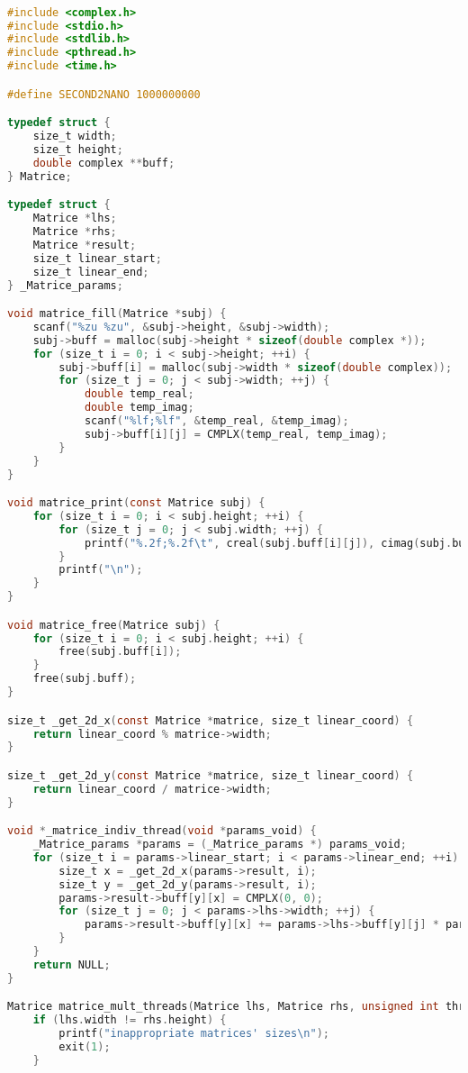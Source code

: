 \begin{lstlisting}[language=C]

#include <complex.h>
#include <stdio.h>
#include <stdlib.h>
#include <pthread.h>
#include <time.h>

#define SECOND2NANO 1000000000

typedef struct {
    size_t width;
    size_t height;
    double complex **buff;
} Matrice;

typedef struct {
    Matrice *lhs;
    Matrice *rhs;
    Matrice *result;
    size_t linear_start;
    size_t linear_end;
} _Matrice_params;

void matrice_fill(Matrice *subj) {
    scanf("%zu %zu", &subj->height, &subj->width);
    subj->buff = malloc(subj->height * sizeof(double complex *));
    for (size_t i = 0; i < subj->height; ++i) {
        subj->buff[i] = malloc(subj->width * sizeof(double complex));
        for (size_t j = 0; j < subj->width; ++j) {
            double temp_real;
            double temp_imag;
            scanf("%lf;%lf", &temp_real, &temp_imag);
            subj->buff[i][j] = CMPLX(temp_real, temp_imag);
        }
    }
}

void matrice_print(const Matrice subj) {
    for (size_t i = 0; i < subj.height; ++i) {
        for (size_t j = 0; j < subj.width; ++j) {
            printf("%.2f;%.2f\t", creal(subj.buff[i][j]), cimag(subj.buff[i][j]));
        }
        printf("\n");
    }
}

void matrice_free(Matrice subj) {
    for (size_t i = 0; i < subj.height; ++i) {
        free(subj.buff[i]);
    }
    free(subj.buff);
}

size_t _get_2d_x(const Matrice *matrice, size_t linear_coord) {
    return linear_coord % matrice->width;
}

size_t _get_2d_y(const Matrice *matrice, size_t linear_coord) {
    return linear_coord / matrice->width;
}

void *_matrice_indiv_thread(void *params_void) {
    _Matrice_params *params = (_Matrice_params *) params_void;
    for (size_t i = params->linear_start; i < params->linear_end; ++i) {
        size_t x = _get_2d_x(params->result, i);
        size_t y = _get_2d_y(params->result, i);
        params->result->buff[y][x] = CMPLX(0, 0);
        for (size_t j = 0; j < params->lhs->width; ++j) {
            params->result->buff[y][x] += params->lhs->buff[y][j] * params->rhs->buff[j][x];
        }      
    }
    return NULL;
}

Matrice matrice_mult_threads(Matrice lhs, Matrice rhs, unsigned int threads_limit) {
    if (lhs.width != rhs.height) {
        printf("inappropriate matrices' sizes\n");
        exit(1);
    }


\end{lstlisting}
